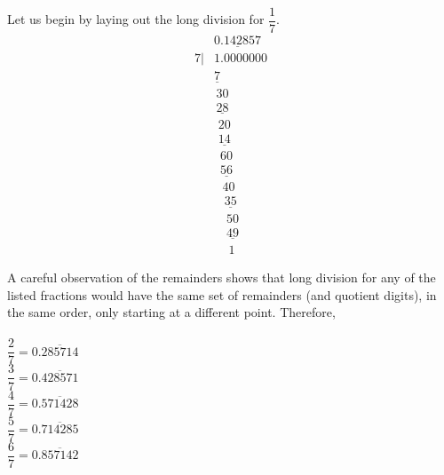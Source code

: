 \ifprintanswers
\fi 
\begin{solution}
	Let us begin by laying out the long division for $\dfrac{1}{7}$.
	\begin{align}
		  & \underline{0.142857}  		\nonumber \\
		7|& 1.0000000 					\nonumber \\
		  & \underline{7}		 		\nonumber \\
		  & \,30	  					\nonumber \\	
		  & \,\underline{28}	 		\nonumber \\
		  & \,\,20						\nonumber \\
		  & \,\,\underline{14} 			\nonumber \\
		  & \,\,\,60					\nonumber \\
		  & \,\,\,\underline{56}		\nonumber \\
		  & \,\,\,\,40					\nonumber \\
		  & \,\,\,\,\,\underline{35}	\nonumber \\
		  & \,\,\,\,\,\,50				\nonumber \\
		  & \,\,\,\,\,\,\underline{49}	\nonumber \\
		  & \,\,\,\,\,\,\,1				\nonumber
	\end{align}
	
	A careful observation of the remainders shows that long division for any of the listed fractions would have the same set of remainders (and quotient digits), in the same order, only starting at a different point. Therefore,\\
	\\
	$\dfrac{2}{7} = 0.\overline{285714}$ \\
	$\dfrac{3}{7} = 0.\overline{428571}$ \\
	$\dfrac{4}{7} = 0.\overline{571428}$ \\
	$\dfrac{5}{7} = 0.\overline{714285}$ \\
	$\dfrac{6}{7} = 0.\overline{857142}$ 

\end{solution}
